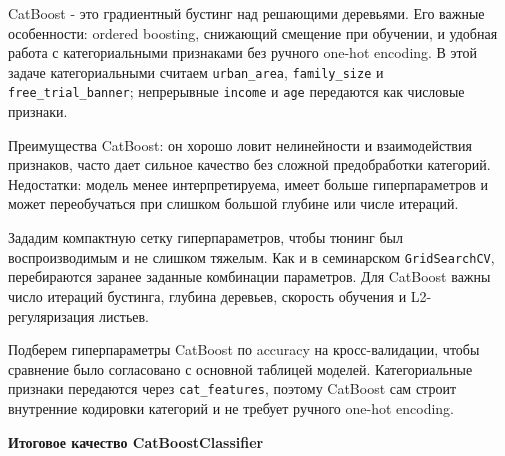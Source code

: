\documentclass[11pt]{article}
\begin{document}
CatBoost - это градиентный бустинг над решающими деревьями. Его важные
особенности: ordered boosting, снижающий смещение при обучении, и
удобная работа с категориальными признаками без ручного one-hot
encoding. В этой задаче категориальными считаем \texttt{urban\_area},
\texttt{family\_size} и \texttt{free\_trial\_banner}; непрерывные
\texttt{income} и \texttt{age} передаются как числовые признаки.

Преимущества CatBoost: он хорошо ловит нелинейности и взаимодействия
признаков, часто дает сильное качество без сложной предобработки
категорий. Недостатки: модель менее интерпретируема, имеет больше
гиперпараметров и может переобучаться при слишком большой глубине или
числе итераций.

    Зададим компактную сетку гиперпараметров, чтобы тюнинг был
воспроизводимым и не слишком тяжелым. Как и в семинарском
\texttt{GridSearchCV}, перебираются заранее заданные комбинации
параметров. Для CatBoost важны число итераций бустинга, глубина
деревьев, скорость обучения и L2-регуляризация листьев.

    Подберем гиперпараметры CatBoost по accuracy на кросс-валидации, чтобы
сравнение было согласовано с основной таблицей моделей. Категориальные
признаки передаются через \texttt{cat\_features}, поэтому CatBoost сам
строит внутренние кодировки категорий и не требует ручного one-hot
encoding.

    \textbf{Итоговое качество CatBoostClassifier}
\end{document}
